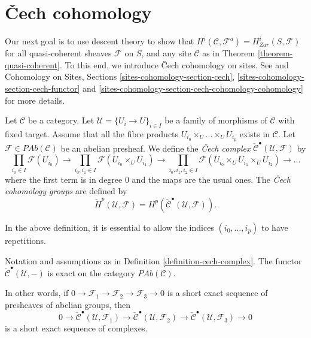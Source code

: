\section{{\v C}ech cohomology}
\label{section-cech-cohomology}

\noindent
Our next goal is to use descent theory to show that
$H^i(\mathcal{C}, \mathcal{F}^a) = H_{Zar}^i(S, \mathcal{F})$
for all quasi-coherent sheaves $\mathcal{F}$ on $S$, and
any site $\mathcal{C}$ as in Theorem \ref{theorem-quasi-coherent}.
To this end, we introduce {\v C}ech cohomology on sites.
See \cite{ArtinTopologies} and
Cohomology on Sites, Sections \ref{sites-cohomology-section-cech},
\ref{sites-cohomology-section-cech-functor}
and \ref{sites-cohomology-section-cech-cohomology-cohomology}
for more details.

\begin{definition}
\label{definition-cech-complex}
Let $\mathcal{C}$ be a category. Let
$\mathcal{U} = \{U_i \to U\}_{i \in I}$ be a family of morphisms of
$\mathcal{C}$ with fixed target. Assume that all the fibre products
$U_{i_0} \times_U \ldots \times_U U_{i_p}$ exists in $\mathcal{C}$.
Let $\mathcal{F} \in \textit{PAb}(\mathcal{C})$ be an abelian
presheaf. We define the {\it {\v C}ech complex}
$\check{\mathcal{C}}^\bullet(\mathcal{U}, \mathcal{F})$ by
$$
\prod_{i_0 \in I} \mathcal{F}(U_{i_0}) \to
\prod_{i_0, i_1 \in I} \mathcal{F}(U_{i_0} \times_U U_{i_1}) \to
\prod_{i_0, i_1, i_2 \in I}
\mathcal{F}(U_{i_0} \times_U U_{i_1} \times_U U_{i_2}) \to \ldots
$$
where the first term is in degree 0 and the maps are the usual ones.
The {\it {\v C}ech cohomology groups} are defined by
$$
\check{H}^p(\mathcal{U}, \mathcal{F}) =
H^p(\check{\mathcal{C}}^\bullet(\mathcal{U}, \mathcal{F})).
$$
\end{definition}

\noindent
In the above definition, it is essential to allow the indices
$(i_0, \ldots, i_p)$ to have repetitions.

\begin{lemma}
\label{lemma-cech-presheaves}
Notation and assumptions as in Definition \ref{definition-cech-complex}.
The functor $\check{\mathcal{C}}^\bullet(\mathcal{U}, -)$
is exact on the category $\textit{PAb}(\mathcal{C})$.
\end{lemma}

\noindent
In other words, if $0\to \mathcal{F}_1\to \mathcal{F}_2\to \mathcal{F}_3\to 0$
is a short exact sequence of presheaves of abelian groups, then
$$
0 \to \check{\mathcal{C}}^\bullet\left(\mathcal{U}, \mathcal{F}_1\right)
\to\check{\mathcal{C}}^\bullet(\mathcal{U}, \mathcal{F}_2) \to
\check{\mathcal{C}}^\bullet(\mathcal{U}, \mathcal{F}_3)\to 0
$$
is a short exact sequence of complexes.

